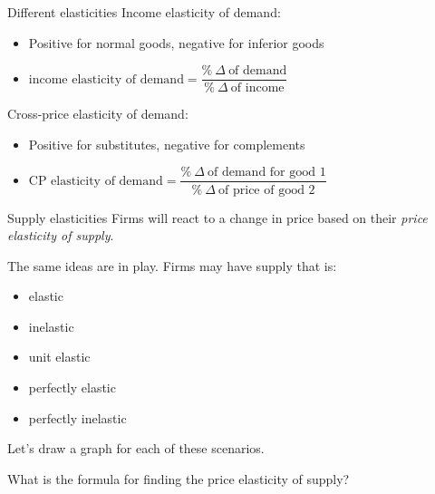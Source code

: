 \documentclass[aspectratio=169]{beamer}
\begin{document}
 \begin{frame}{Different elasticities}
    Income elasticity of demand:
    \begin{itemize}
        \item Positive for normal goods, negative for inferior goods
        \item $\text{income elasticity of demand} = \dfrac{\%~\Delta~\text{of demand}}{\%~\Delta~\text{of income}}$
    \end{itemize}

    \medskip

    Cross-price elasticity of demand:
    \begin{itemize}
        \item Positive for substitutes, negative for complements
        \item $\text{CP elasticity of demand} = \dfrac{\%~\Delta~\text{of demand for good 1}}{\%~\Delta~\text{of price of good 2}}$
    \end{itemize}
 \end{frame}

 \begin{frame}{Supply elasticities}
    Firms will react to a change in price based on their \textit{price elasticity of supply}.

    \vspace{5mm}

    The same ideas are in play. Firms may have supply that is:
    \begin{itemize}
        \item elastic
        \item inelastic
        \item unit elastic
        \item perfectly elastic
        \item perfectly inelastic
    \end{itemize}

    Let's draw a graph for each of these scenarios.

    \medskip

    What is the formula for finding the price elasticity of supply?
 \end{frame}
\end{document}
